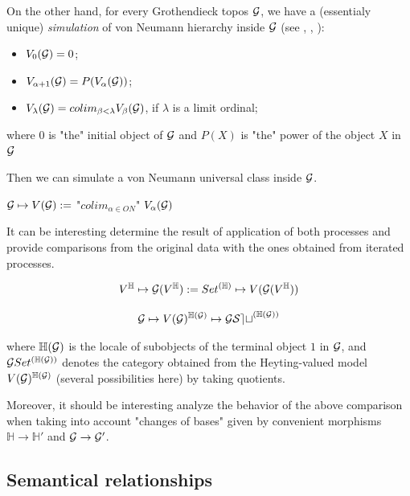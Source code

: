 \documentclass[10pt,longbibliography]{article}
\newcommand{\He}{\mathbb{H}}
\begin{document}
\vspace{0.5cm}

On the other hand, for every Grothendieck topos $\cal G$, we have a (essentialy unique) {\em simulation} of von Neumann hierarchy inside $\cal G$ (see \cite{Fourman80}, \cite{Hayashi81}, \cite{Streicher09}):

\begin{itemize}
    \item  $V_0({\cal G}) = 0$; 
 
\item $V_{\alpha+1}({\cal G})  = P(V_{\alpha}({\cal G}))$; 
 
\item $V_\lambda({\cal G}) =  colim_{\beta<\lambda} V_\beta({\cal G})$, if $\lambda$ is a limit ordinal;

\end{itemize}
where $0$ is "the" initial object of $\cal G$ and $P(X)$ is "the" power of the object $X$ in $\cal G$

Then we can simulate a von Neumann universal class inside $\cal G$.

${\cal G} \mapsto V(\cal G) :=$ "$colim_{\alpha \in ON}$" $V_\alpha(\cal G)$


It can be interesting determine the result of application of both processes and provide comparisons from the original data with the ones obtained from iterated processes.

$$V^\He \mapsto {\cal G}(V^\He):= Set^{(\He)}  \mapsto V({\cal G}(V^\He))$$

$${\cal G} \mapsto V(\cal G)^{\He(\cal G)} \mapsto {\mathcal G} {Set}^{(\He(\cal G))}$$

where ${\He(\cal G)}$ is the locale of subobjects of the terminal object $1$ in $\cal G$, and ${\cal G}Set^{(\He(\cal G))}$ denotes the category obtained from the Heyting-valued model $V(\cal G)^{\He(\cal G)}$ (several possibilities here) by taking quotients. 


Moreover, it should be interesting analyze the behavior of the above comparison when taking into account  "changes of bases" given by convenient morphisms $\He \to \He'$ and ${\cal G} \to {\cal G}'$.




\subsection{Semantical relationships}
\end{document}
